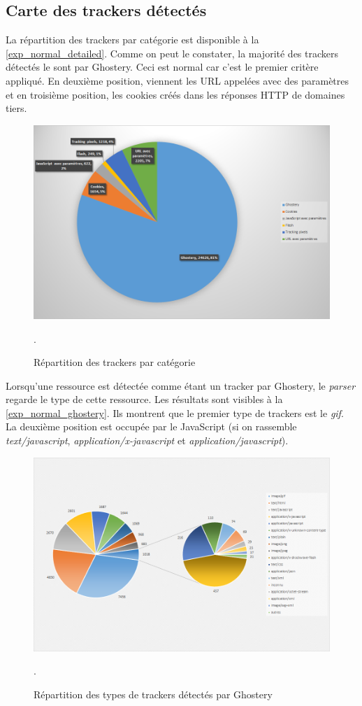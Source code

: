 \subsection{Carte des trackers détectés}
La répartition des trackers par catégorie est disponible à la \autoref{exp_normal_detailed}. Comme on peut le constater, la majorité des trackers détectés le sont par Ghostery. Ceci est normal car c'est le premier critère appliqué. En deuxième position, viennent les URL appelées avec des paramètres et en troisième position, les cookies créés dans les réponses HTTP de domaines tiers.

\begin{figure}[h]
	\centering
	\includegraphics[scale=.60]{Analyses_graphiques/Images/Normal_detailed.png}
	\caption{\label{exp_normal_detailed}Répartition des trackers par catégorie}.
\end{figure}

Lorsqu'une ressource est détectée comme étant un tracker par Ghostery, le \textit{parser} regarde le type de cette ressource. Les résultats sont visibles à la \autoref{exp_normal_ghostery}. Ils montrent que le premier type de trackers est le \textit{gif}. La deuxième position est occupée par le JavaScript (si on rassemble \textit{text/javascript}, \textit{application/x-javascript} et \textit{application/javascript}).
\begin{figure}[h]
	\centering
	\includegraphics[scale=.60]{Analyses_graphiques/Images/Normal_ghostery.png}
	\caption{\label{exp_normal_ghostery}Répartition des types de trackers détectés par Ghostery}.
\end{figure}

